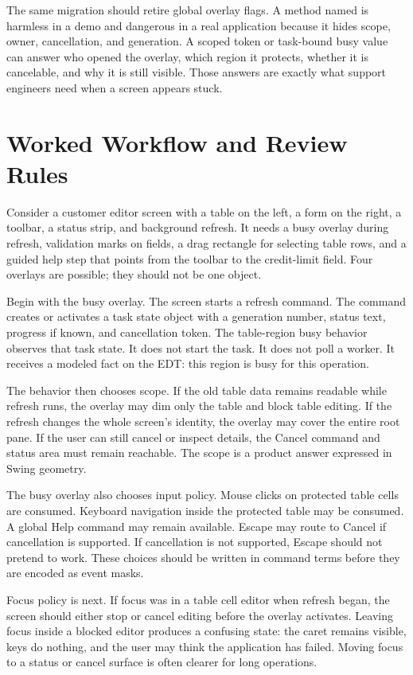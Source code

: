 The same migration should retire global overlay flags. A method named
 is harmless in a demo and dangerous in a real application
because it hides scope, owner, cancellation, and generation. A scoped token or
task-bound busy value can answer who opened the overlay, which region it
protects, whether it is cancelable, and why it is still visible. Those answers
are exactly what support engineers need when a screen appears stuck.

\section{Worked Workflow and Review Rules}

Consider a customer editor screen with a table on the left, a form on the right, a toolbar, a status strip, and background refresh. It needs a busy overlay during refresh, validation marks on fields, a drag rectangle for selecting table rows, and a guided help step that points from the toolbar to the credit-limit field. Four overlays are possible; they should not be one object.

Begin with the busy overlay. The screen starts a refresh command. The command creates or activates a task state object with a generation number, status text, progress if known, and cancellation token. The table-region busy behavior observes that task state. It does not start the task. It does not poll a worker. It receives a modeled fact on the EDT: this region is busy for this operation.

The behavior then chooses scope. If the old table data remains readable while refresh runs, the overlay may dim only the table and block table editing. If the refresh changes the whole screen's identity, the overlay may cover the entire root pane. If the user can still cancel or inspect details, the Cancel command and status area must remain reachable. The scope is a product answer expressed in Swing geometry.

The busy overlay also chooses input policy. Mouse clicks on protected table cells are consumed. Keyboard navigation inside the protected table may be consumed. A global Help command may remain available. Escape may route to Cancel if cancellation is supported. If cancellation is not supported, Escape should not pretend to work. These choices should be written in command terms before they are encoded as event masks.

Focus policy is next. If focus was in a table cell editor when refresh began, the screen should either stop or cancel editing before the overlay activates. Leaving focus inside a blocked editor produces a confusing state: the caret remains visible, keys do nothing, and the user may think the application has failed. Moving focus to a status or cancel surface is often clearer for long operations.


